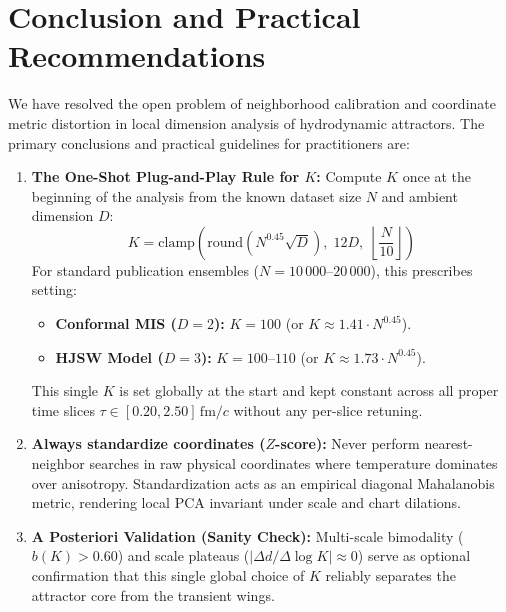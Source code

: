 \documentclass[11pt,a4paper]{article}
\begin{document}
\section{Conclusion and Practical Recommendations}
\label{sec:conclusion}
We have resolved the open problem of neighborhood calibration and coordinate metric distortion in local dimension analysis of hydrodynamic attractors. The primary conclusions and practical guidelines for practitioners are:

\begin{enumerate}
    \item \textbf{The One-Shot Plug-and-Play Rule for $K$:} Compute $K$ once at the beginning of the analysis from the known dataset size $N$ and ambient dimension $D$:
    \begin{equation}
        \boxed{K = \mathrm{clamp}\left(\mathrm{round}\left(N^{0.45}\sqrt{D}\right), \; 12D, \; \left\lfloor\frac{N}{10}\right\rfloor\right)}
    \end{equation}
    For standard publication ensembles ($N = 10\,000$--$20\,000$), this prescribes setting:
    \begin{itemize}
        \item \textbf{Conformal MIS ($D=2$):} $K = 100$ (or $K \approx 1.41 \cdot N^{0.45}$).
        \item \textbf{HJSW Model ($D=3$):} $K = 100$--$110$ (or $K \approx 1.73 \cdot N^{0.45}$).
    \end{itemize}
    This single $K$ is set globally at the start and kept constant across all proper time slices $\tau \in [0.20, 2.50]\,\mathrm{fm}/c$ without any per-slice retuning.
    \item \textbf{Always standardize coordinates ($Z$-score):} Never perform nearest-neighbor searches in raw physical coordinates where temperature dominates over anisotropy. Standardization acts as an empirical diagonal Mahalanobis metric, rendering local PCA invariant under scale and chart dilations.
    \item \textbf{A Posteriori Validation (Sanity Check):} Multi-scale bimodality ($b(K) > 0.60$) and scale plateaus ($|\Delta d / \Delta \log K| \approx 0$) serve as optional confirmation that this single global choice of $K$ reliably separates the attractor core from the transient wings.
\end{enumerate}
\end{document}
